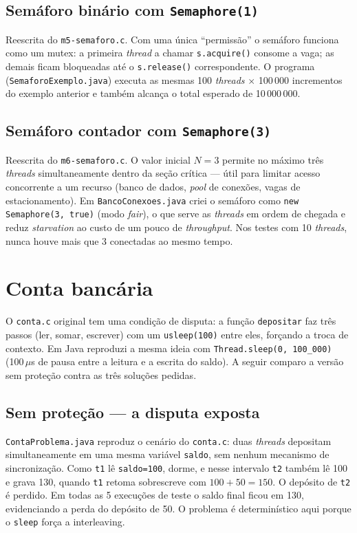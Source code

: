 \subsection{Semáforo binário com \texttt{Semaphore(1)}}

Reescrita do \texttt{m5-semaforo.c}. Com uma única ``permissão'' o semáforo
funciona como um mutex: a primeira \textit{thread} a chamar
\texttt{s.acquire()} consome a vaga; as demais ficam bloqueadas até o
\texttt{s.release()} correspondente. O programa
(\texttt{SemaforoExemplo.java}) executa as mesmas 100 \textit{threads}
$\times$ 100\,000 incrementos do exemplo anterior e também alcança o
total esperado de 10\,000\,000.

\subsection{Semáforo contador com \texttt{Semaphore(3)}}

Reescrita do \texttt{m6-semaforo.c}. O valor inicial $N=3$ permite no
máximo três \textit{threads} simultaneamente dentro da seção crítica
--- útil para limitar acesso concorrente a um recurso (banco de dados,
\textit{pool} de conexões, vagas de estacionamento). Em
\texttt{BancoConexoes.java} criei o semáforo como
\texttt{new Semaphore(3, true)} (modo \textit{fair}), o que serve as
\textit{threads} em ordem de chegada e reduz \textit{starvation} ao custo
de um pouco de \textit{throughput}. Nos testes com 10 \textit{threads},
nunca houve mais que 3 conectadas ao mesmo tempo.

\section{Conta bancária}

O \texttt{conta.c} original tem uma condição de disputa: a função
\texttt{depositar} faz três passos (ler, somar, escrever) com um
\texttt{usleep(100)} entre eles, forçando a troca de contexto. Em Java
reproduzi a mesma ideia com \texttt{Thread.sleep(0, 100\_000)}
(100\,$\mu$s de pausa entre a leitura e a escrita do saldo). A seguir
comparo a versão sem proteção contra as três soluções pedidas.

\subsection{Sem proteção --- a disputa exposta}

\texttt{ContaProblema.java} reproduz o cenário do \texttt{conta.c}: duas
\textit{threads} depositam simultaneamente em uma mesma variável
\texttt{saldo}, sem nenhum mecanismo de sincronização. Como
\texttt{t1} lê \texttt{saldo=100}, dorme, e nesse intervalo \texttt{t2}
também lê 100 e grava 130, quando \texttt{t1} retoma sobrescreve com
$100+50=150$. O depósito de \texttt{t2} é perdido. Em todas as 5
execuções de teste o saldo final ficou em 130, evidenciando a perda do
depósito de 50. O problema é determinístico aqui porque o \texttt{sleep}
força a interleaving.

